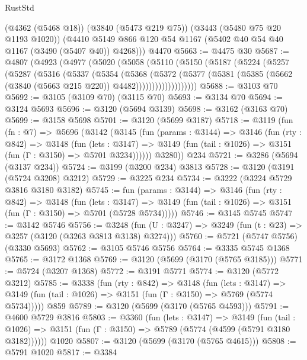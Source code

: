 \begin{lexlean}{RustStd}
\begin{coremodule}
      (@4362 (@5468 @18))
      (@3840 (@5473 @219 @75))
      (@3443 (@5480 @75 @20 @1193 @1020))
      (@4410 @5149 @866 @120 @54 @1167 (@5402 @40 @54 @40 @1167 (@3490 (@5407 @40)) @4268)))
    @4470
@5663 := @4475 @30
@5687 := @4807
    (@4923
      (@4977
        (@5020
          (@5058
            (@5110
              (@5150
                (@5187
                  (@5224
                    (@5257
                      (@5287
                        (@5316
                          (@5337
                            (@5354
                              (@5368
                                (@5372
                                  (@5377
                                    (@5381
                                      (@5385
                                        (@5662 (@3840 (@5663 @215 @220)) @4482)))))))))))))))))))
@5688 := @3103 @70
@5692 := @3105 (@3109 @70) (@3115 @70)
@5693 := @3134 @70
@5694 := @3124 @5693
@5696 := @3120 (@5694 @3139)
@5698 := @3162 (@3163 @70)
@5699 := @3158 @5698
@5701 := @3120 (@5699 @3187)
@5718 := @3119
    (fun (fn : @7) =>
    @5696
      (@3142
        (@3145
          (fun (params : @3144) =>
          @3146
            (fun (rty : @842) =>
            @3148
              (fun (lets : @3147) =>
              @3149 (fun (tail : @1026) => @3151 (fun (Γ : @3150) => @5701 @3234))))))
        @3280))
    @234
@5721 := @3286 (@5694 (@3137 @234))
@5724 := @3199 (@3200 @234) @3813
@5728 := @3120 (@3191 (@5724 @3208) @3212)
@5729 := @3225 @234
@5734 := @3222 (@3224 @5729 @3816 @3180 @3182)
@5745 := fun (params : @3144) =>
  @3146
    (fun (rty : @842) =>
    @3148
      (fun (lets : @3147) =>
      @3149 (fun (tail : @1026) => @3151 (fun (Γ : @3150) => @5701 (@5728 @5734)))))
@5746 := @3145 @5745
@5747 := @3142 @5746
@5756 := @3248 (fun (U : @3247) => @3249 (fun (t : @23) => @3257 (@3120 (@3263 @3813 @3138) @3274)))
@5760 := @5721 (@5747 @5756) (@3330 @5693)
@5762 := @3105 @5746 @5756
@5764 := @3335 @5745 @1368
@5765 := @3172 @1368
@5769 := @3120 (@5699 (@3170 (@5765 @3185)))
@5771 := @5724 (@3207 @1368)
@5772 := @3191 @5771
@5774 := @3120 (@5772 @3212)
@5785 := @3338
    (fun (rty : @842) =>
    @3148
      (fun (lets : @3147) =>
      @3149 (fun (tail : @1026) => @3151 (fun (Γ : @3150) => @5769 (@5774 @5734)))))
    @859
@5789 := @3120 (@5699 (@3170 (@5765 @4593)))
@5791 := @4600 @5729 @3816
@5803 := @3360
    (fun (lets : @3147) =>
    @3149
      (fun (tail : @1026) => @3151 (fun (Γ : @3150) => @5789 (@5774 (@4599 (@5791 @3180 @3182))))))
    @1020
@5807 := @3120 (@5699 (@3170 (@5765 @4615)))
@5808 := @5791 @1020
@5817 := @3384

\end{coremodule}
\end{lexlean}
